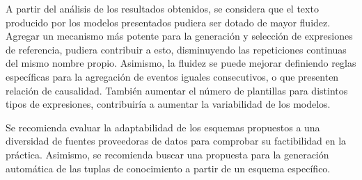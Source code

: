 \begin{recomendations}

   A partir del análisis de los resultados obtenidos, se considera que el texto producido por los 
modelos presentados pudiera ser dotado de mayor fluidez. Agregar un mecanismo más potente
para la generaci\'on y selección de expresiones de referencia, pudiera contribuir
a esto, disminuyendo las repeticiones continuas del mismo nombre propio. Asimismo, la fluidez se puede mejorar definiendo reglas 
específicas para la agregación de eventos iguales consecutivos, o que presenten relación de causalidad.
También aumentar el número de plantillas para distintos tipos de expresiones, 
contribuiría a aumentar la variabilidad de los modelos.

Se recomienda evaluar la adaptabilidad de los esquemas propuestos a una diversidad de fuentes proveedoras de datos para comprobar su 
factibilidad en la práctica. Asimismo, se recomienda buscar una propuesta para la generación automática de las tuplas de 
conocimiento a partir de un esquema específico. 
 



\end{recomendations}
